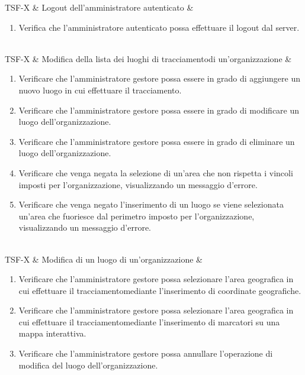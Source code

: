 TSF-X & Logout dell'amministratore autenticato & \begin{enumerate}
    \item Verifica che l'amministratore autenticato possa effettuare il logout dal server.
\end{enumerate} \\

TSF-X & Modifica della lista dei luoghi di tracciamentodi un'organizzazione & \begin{enumerate}
    \item Verificare che l'amministratore gestore possa essere in grado di aggiungere un nuovo luogo in cui effettuare il tracciamento.
    \item Verificare che l'amministratore gestore possa essere in grado di modificare un luogo dell'organizzazione.
    \item Verificare che l'amministratore gestore possa essere in grado di eliminare un luogo dell'organizzazione.
    \item Verificare che venga negata la selezione di un'area che non rispetta i vincoli imposti per l'organizzazione, visualizzando un messaggio d'errore.
    \item Verificare che venga negato l'inserimento di un luogo se viene selezionata un'area che fuoriesce dal perimetro imposto per l'organizzazione, visualizzando un messaggio d'errore.
\end{enumerate} \\

TSF-X & Modifica di un luogo di un'organizzazione & \begin{enumerate}
    \item Verificare che l'amministratore gestore possa selezionare l'area geografica in cui effettuare il tracciamentomediante l'inserimento di coordinate geografiche.
    \item Verificare che l'amministratore gestore possa selezionare l'area geografica in cui effettuare il tracciamentomediante l'inserimento di marcatori su una mappa interattiva.
    \item Verificare che l'amministratore gestore possa annullare l'operazione di modifica del luogo dell'organizzazione.
\end{enumerate} \\

